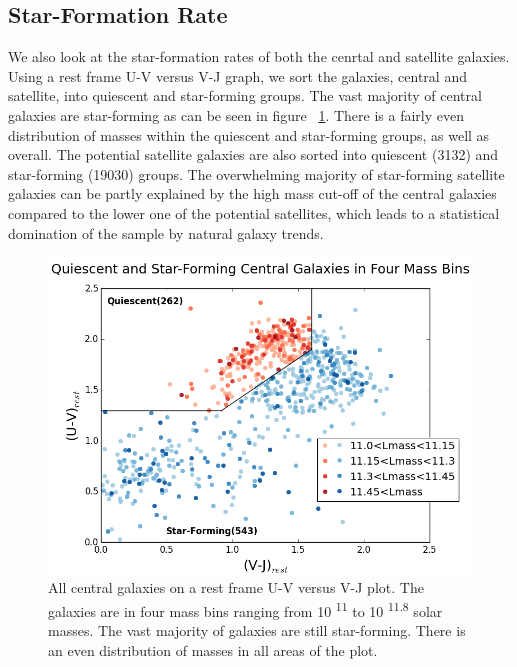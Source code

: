 \documentclass[apj]{emulateapj}
\begin{document}
\subsection{Star-Formation Rate}

We also look at the star-formation rates of both the cenrtal and satellite galaxies. Using a rest frame U-V versus V-J graph, we sort the galaxies, central and satellite, into quiescent and star-forming groups. The vast majority of central galaxies are star-forming as can be seen in figure ~\ref{fig:color}. There is a fairly even distribution of masses within the quiescent and star-forming groups, as well as overall. The potential satellite galaxies are also sorted into quiescent (3132) and star-forming (19030) groups. The overwhelming majority of star-forming satellite galaxies can be partly explained by the high mass cut-off of the central galaxies compared to the lower one of the potential satellites, which leads to a statistical domination of the sample by natural galaxy trends. 

\begin{figure}
\centering
\graphicspath{{C:/3d_hst/2015_finals/Colors/}}
\includegraphics[width=\linewidth]{temp_color_final}
\caption{\footnotesize All central galaxies on a rest frame U-V versus V-J plot. The galaxies are in four mass bins ranging from 10 \textsuperscript{11} to 10 \textsuperscript{11.8} solar masses. The vast majority of galaxies are still star-forming. There is an even distribution of masses in all areas of the plot.}
\label{fig:color}
\end{figure}
\end{document}
